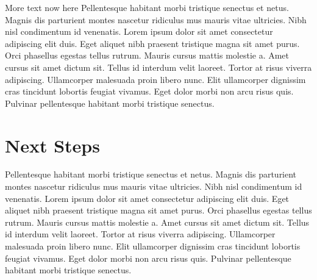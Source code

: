 \documentclass[article,30pt,extrafontsizes,showtrims]{memoir}
\begin{document}
\begin{multicols*}{3}
{More text now here Pellentesque habitant morbi tristique senectus et
netus. Magnis dis parturient montes nascetur ridiculus mus mauris vitae
ultricies. Nibh nisl condimentum id venenatis. Lorem ipsum dolor sit
amet consectetur adipiscing elit duis. Eget aliquet nibh praesent
tristique magna sit amet purus. Orci phasellus egestas tellus rutrum.
Mauris cursus mattis molestie a. Amet cursus sit amet dictum sit. Tellus
id interdum velit laoreet. Tortor at risus viverra adipiscing.
Ullamcorper malesuada proin libero nunc. Elit ullamcorper dignissim cras
tincidunt lobortis feugiat vivamus. Eget dolor morbi non arcu risus
quis. Pulvinar pellentesque habitant morbi tristique senectus.

\section{Next Steps}\label{next-steps}

Pellentesque habitant morbi tristique senectus et netus. Magnis dis
parturient montes nascetur ridiculus mus mauris vitae ultricies. Nibh
nisl condimentum id venenatis. Lorem ipsum dolor sit amet consectetur
adipiscing elit duis. Eget aliquet nibh praesent tristique magna sit
amet purus. Orci phasellus egestas tellus rutrum. Mauris cursus mattis
molestie a. Amet cursus sit amet dictum sit. Tellus id interdum velit
laoreet. Tortor at risus viverra adipiscing. Ullamcorper malesuada proin
libero nunc. Elit ullamcorper dignissim cras tincidunt lobortis feugiat
vivamus. Eget dolor morbi non arcu risus quis. Pulvinar pellentesque
habitant morbi tristique senectus.
\printbibliography
}
\end{multicols*}

\end{document}
